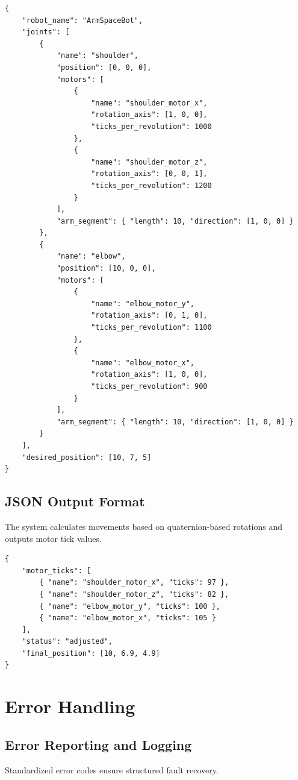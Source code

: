 \documentclass{article}
\begin{document}
\begin{verbatim}
{
    "robot_name": "ArmSpaceBot",
    "joints": [
        {
            "name": "shoulder",
            "position": [0, 0, 0],
            "motors": [
                {
                    "name": "shoulder_motor_x",
                    "rotation_axis": [1, 0, 0],
                    "ticks_per_revolution": 1000
                },
                {
                    "name": "shoulder_motor_z",
                    "rotation_axis": [0, 0, 1],
                    "ticks_per_revolution": 1200
                }
            ],
            "arm_segment": { "length": 10, "direction": [1, 0, 0] }
        },
        {
            "name": "elbow",
            "position": [10, 0, 0],
            "motors": [
                {
                    "name": "elbow_motor_y",
                    "rotation_axis": [0, 1, 0],
                    "ticks_per_revolution": 1100
                },
                {
                    "name": "elbow_motor_x",
                    "rotation_axis": [1, 0, 0],
                    "ticks_per_revolution": 900
                }
            ],
            "arm_segment": { "length": 10, "direction": [1, 0, 0] }
        }
    ],
    "desired_position": [10, 7, 5]
}
\end{verbatim}

\subsection{JSON Output Format}
The system calculates movements based on quaternion-based rotations and outputs motor tick values.

\begin{verbatim}
{
    "motor_ticks": [
        { "name": "shoulder_motor_x", "ticks": 97 },
        { "name": "shoulder_motor_z", "ticks": 82 },
        { "name": "elbow_motor_y", "ticks": 100 },
        { "name": "elbow_motor_x", "ticks": 105 }
    ],
    "status": "adjusted",
    "final_position": [10, 6.9, 4.9]
}
\end{verbatim}

\section{Error Handling}
\subsection{Error Reporting and Logging}
Standardized error codes ensure structured fault recovery.
\end{document}
